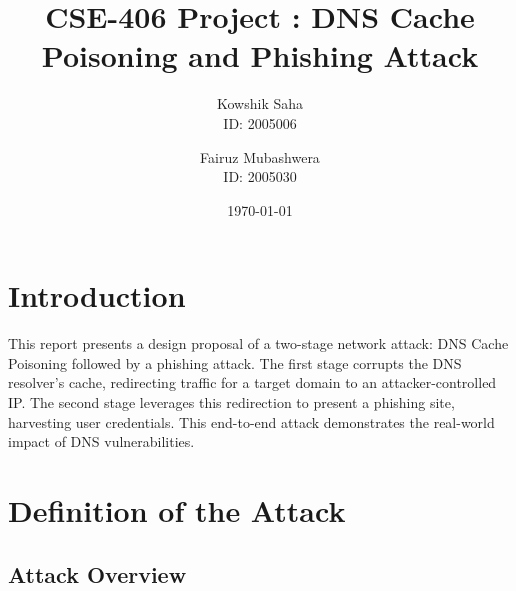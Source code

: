 \documentclass[12pt,a4paper]{article}
\title{CSE-406 Project : DNS Cache Poisoning and Phishing Attack}
\author{
    Kowshik Saha\\
    ID: 2005006
    \and
    Fairuz Mubashwera\\
    ID: 2005030
}
\date{\today}
\begin{document}
\maketitle

\tableofcontents
\newpage

\section{Introduction}

This report presents a design proposal of a two-stage network attack: DNS Cache Poisoning followed by a phishing attack. The first stage corrupts the DNS resolver's cache, redirecting traffic for a target domain to an attacker-controlled IP. The second stage leverages this redirection to present a phishing site, harvesting user credentials. This end-to-end attack demonstrates the real-world impact of DNS vulnerabilities.

\section{Definition of the Attack}

\subsection{Attack Overview}
\end{document}
